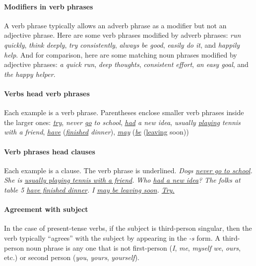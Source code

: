 \paragraph*{Modifiers in verb phrases}
A verb phrase typically allows an adverb phrase as a modifier but not an adjective phrase. Here are some verb phrases modified by adverb phrases:  \textit{run quickly}, \textit{think deeply}, \textit{try consistently}, \textit{always be good}, \textit{easily do it}, and \textit{happily help}. And for comparison, here are some matching noun phrases modified by adjective phrases:  \textit{a quick run}, \textit{deep thoughts}, \textit{consistent effort}, \textit{an easy goal}, and \textit{the happy helper}.

\paragraph*{Verbs head verb phrases}
Each example is a verb phrase. Parentheses enclose smaller verb phrases inside the larger ones: \textit{\uline{try}}, \textit{never \uline{go} to school}, \textit{\uline{had} a new idea}, \textit{usually \uline{playing} tennis with a friend}, \textit{\uline{have} }(\textit{\uline{finished} dinner}), \textit{\uline{may} }(\textit{\uline{be} }(\uline{leaving} soon))

\paragraph*{Verb phrases head clauses}\label{sec:VPs_head_clauses}
Each example is a clause. The verb phrase is underlined. \textit{Dogs \uline{never go to school}.}  \textit{She is \uline{usually playing tennis with a friend}.} \textit{Who \uline{had a new idea}?} \textit{The folks at table 5 \uline{have finished dinner}.} \textit{I \uline{may be leaving soon}.} \textit{\uline{Try.}} 

\paragraph*{Agreement with subject}\label{sec:agreement}
In the case of present-tense verbs, if the subject is third-person singular, then the verb typically ``agrees'' with the subject by appearing in the \textit{-s} form. A third-person noun phrase is any one that is not first-person (\textit{I}, \textit{me}, \textit{myself} \textit{we}, \textit{ours}, etc.) or second person (\textit{you}, \textit{yours}, \textit{yourself}).

